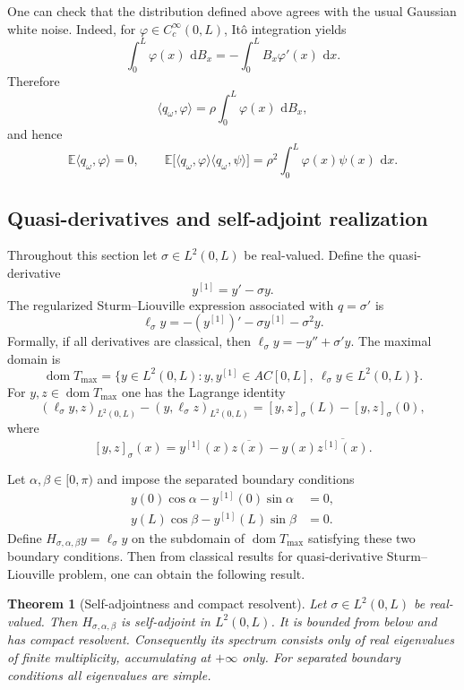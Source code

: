 \documentclass[11pt]{article}
\newtheorem{theorem}{Theorem}[section]
\newcommand{\dd}{\,\mathrm d}
\newcommand{\dom}{\operatorname{dom}}
\begin{document}
One can check that the distribution defined above agrees with the usual Gaussian white noise. Indeed, for $\varphi\in C_c^\infty(0,L)$, It\^o integration yields
\begin{equation*}
    \int_0^L \varphi(x)\,\dd B_x
    =-\int_0^L B_x\varphi'(x)\,\dd x.
\end{equation*}
Therefore
\begin{equation*}
    \langle q_\omega,\varphi\rangle=\rho \int_0^L \varphi(x)\,\dd B_x,
\end{equation*}
and hence
\begin{equation*}
    \mathbb E\langle q_\omega,\varphi\rangle=0,
    \qquad
    \mathbb E\bigl[\langle q_\omega,\varphi\rangle\langle q_\omega,\psi\rangle\bigr]
    =\rho^2\int_0^L \varphi(x)\psi(x)\,\dd x.
\end{equation*}

\subsection{Quasi-derivatives and self-adjoint realization}

Throughout this section let $\sigma\in L^2(0,L)$ be real-valued. Define the quasi-derivative
\[
    y^{[1]}=y'-\sigma y.
\]
The regularized Sturm--Liouville expression associated with $q=\sigma'$ is
\[
    \ell_\sigma y=-(y^{[1]})'-\sigma y^{[1]}-\sigma^2 y.
\]
Formally, if all derivatives are classical, then $\ell_\sigma y=-y''+\sigma' y$. The maximal domain is
\[
    \dom T_{\max}=\{y\in L^2(0,L): y,y^{[1]}\in AC[0,L],\ \ell_\sigma y\in L^2(0,L)\}.
\]
For $y,z\in\dom T_{\max}$ one has the Lagrange identity
\[
    (\ell_\sigma y,z)_{L^2(0,L)}-(y,\ell_\sigma z)_{L^2(0,L)}
    =[y,z]_\sigma(L)-[y,z]_\sigma(0),
\]
where
\[
    [y,z]_\sigma(x)=y^{[1]}(x)\overline{z(x)}-y(x)\overline{z^{[1]}(x)}.
\]

Let $\alpha,\beta\in[0,\pi)$ and impose the separated boundary conditions
\begin{align*}
    y(0)\cos\alpha-y^{[1]}(0)\sin\alpha&=0,\\
    y(L)\cos\beta-y^{[1]}(L)\sin\beta&=0.
\end{align*}
Define $H_{\sigma,\alpha,\beta}y=\ell_\sigma y$ on the subdomain of $\dom T_{\max}$ satisfying these two boundary conditions. Then from classical results for quasi-derivative Sturm--Liouville problem, one can obtain the following result.

\begin{theorem}[Self-adjointness and compact resolvent]\label{thm:sa-compact}
Let $\sigma\in L^2(0,L)$ be real-valued. Then $H_{\sigma,\alpha,\beta}$ is self-adjoint in $L^2(0,L)$. It is bounded from below and has compact resolvent. Consequently its spectrum consists only of real eigenvalues of finite multiplicity, accumulating at $+\infty$ only. For separated boundary conditions all eigenvalues are simple.
\end{theorem}
\end{document}
